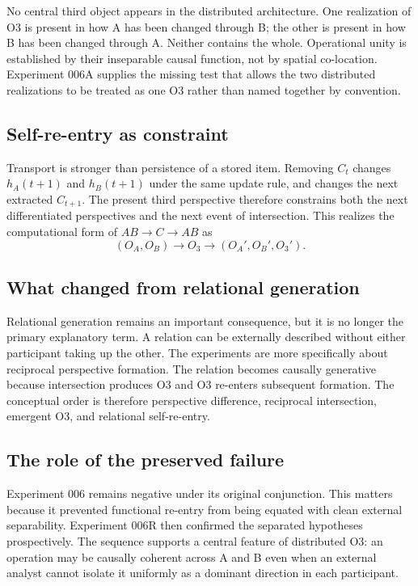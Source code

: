 \documentclass[11pt,a4paper]{article}
\newcommand{\OA}{\ensuremath{O_{A}}}
\newcommand{\OB}{\ensuremath{O_{B}}}
\newcommand{\Othree}{\ensuremath{O_{3}}}
\begin{document}
No central third object appears in the distributed architecture. One realization of O3 is present in how A has been changed through B; the other is present in how B has been changed through A. Neither contains the whole. Operational unity is established by their inseparable causal function, not by spatial co-location. Experiment 006A supplies the missing test that allows the two distributed realizations to be treated as one O3 rather than named together by convention.

\subsection{Self-re-entry as constraint}

Transport is stronger than persistence of a stored item. Removing $C_t$ changes $h_A(t+1)$ and $h_B(t+1)$ under the same update rule, and changes the next extracted $C_{t+1}$. The present third perspective therefore constrains both the next differentiated perspectives and the next event of intersection. This realizes the computational form of $AB\rightarrow C\rightarrow AB$ as
\[
 (\OA,\OB)\rightarrow\Othree
 \rightarrow(\OA',\OB',\Othree').
\]

\subsection{What changed from relational generation}

Relational generation remains an important consequence, but it is no longer the primary explanatory term. A relation can be externally described without either participant taking up the other. The experiments are more specifically about reciprocal perspective formation. The relation becomes causally generative because intersection produces O3 and O3 re-enters subsequent formation. The conceptual order is therefore perspective difference, reciprocal intersection, emergent O3, and relational self-re-entry.

\subsection{The role of the preserved failure}

Experiment 006 remains negative under its original conjunction. This matters because it prevented functional re-entry from being equated with clean external separability. Experiment 006R then confirmed the separated hypotheses prospectively. The sequence supports a central feature of distributed O3: an operation may be causally coherent across A and B even when an external analyst cannot isolate it uniformly as a dominant direction in each participant.
\end{document}
